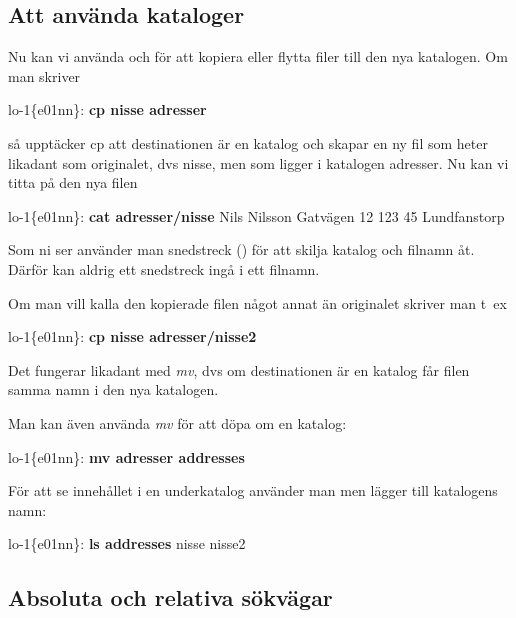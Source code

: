 \documentclass[a4paper,twocolumn]{book}
\begin{document}
\subsection{Att använda kataloger}

Nu kan vi använda  och  för att kopiera eller
flytta filer till den nya katalogen. Om man skriver
\begin{example}
lo-1\{e01nn\}: \textbf{cp nisse adresser}
\end{example}
så upptäcker cp att destinationen är en katalog och skapar en ny fil
som heter likadant som originalet, dvs nisse, men som ligger i
katalogen adresser. Nu kan vi titta på den nya filen
\begin{example}
lo-1\{e01nn\}: \textbf{cat adresser/nisse}
Nils Nilsson
Gatvägen 12
123 45 Lundfanstorp
\end{example}
Som ni ser använder man snedstreck (\ST{/}) för att skilja katalog och
filnamn åt. Därför kan aldrig ett snedstreck ingå i ett filnamn.

Om man vill kalla den kopierade filen något annat än originalet
skriver man t~ex
\begin{example}
lo-1\{e01nn\}: \textbf{cp nisse adresser/nisse2}
\end{example} 
Det fungerar likadant med \emph{mv}, dvs om destinationen är en
katalog får filen samma namn i den nya katalogen.

Man kan även använda \emph{mv} för att döpa om en katalog:
\begin{example}
lo-1\{e01nn\}: \textbf{mv adresser addresses}
\end{example}
För att se innehållet i en underkatalog använder man  men
lägger till katalogens namn:
\begin{example}
lo-1\{e01nn\}: \textbf{ls addresses}
nisse    nisse2
\end{example}
\subsection{Absoluta och relativa sökvägar}
\end{document}
